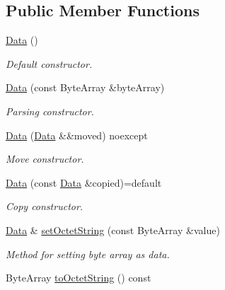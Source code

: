 \subsection*{Public Member Functions}
\begin{DoxyCompactItemize}
\item 
\mbox{\label{classDiameter_1_1AVP_1_1Data_a37f612363f90b54dafc6fff7f21104f0}} 
\hyperlink{classDiameter_1_1AVP_1_1Data_a37f612363f90b54dafc6fff7f21104f0}{Data} ()
\begin{DoxyCompactList}\small\item\em Default constructor. \end{DoxyCompactList}\item 
\hyperlink{classDiameter_1_1AVP_1_1Data_a204b2752879567b7db58d0b1f567152d}{Data} (const Byte\+Array \&byte\+Array)
\begin{DoxyCompactList}\small\item\em Parsing constructor. \end{DoxyCompactList}\item 
\mbox{\label{classDiameter_1_1AVP_1_1Data_ab0eb2092eb046830e80053caa2840f2e}} 
\hyperlink{classDiameter_1_1AVP_1_1Data_ab0eb2092eb046830e80053caa2840f2e}{Data} (\hyperlink{classDiameter_1_1AVP_1_1Data}{Data} \&\&moved) noexcept
\begin{DoxyCompactList}\small\item\em Move constructor. \end{DoxyCompactList}\item 
\hyperlink{classDiameter_1_1AVP_1_1Data_a156c0f23cc44db70a41d609795e76f4c}{Data} (const \hyperlink{classDiameter_1_1AVP_1_1Data}{Data} \&copied)=default
\begin{DoxyCompactList}\small\item\em Copy constructor. \end{DoxyCompactList}\item 
\hyperlink{classDiameter_1_1AVP_1_1Data}{Data} \& \hyperlink{classDiameter_1_1AVP_1_1Data_a12bbc6bbced56e8151e34e7b49963963}{set\+Octet\+String} (const Byte\+Array \&value)
\begin{DoxyCompactList}\small\item\em Method for setting byte array as data. \end{DoxyCompactList}\item 
Byte\+Array \hyperlink{classDiameter_1_1AVP_1_1Data_aa344738719504128278ccdecd2baea77}{to\+Octet\+String} () const

\end{DoxyCompactItemize}
